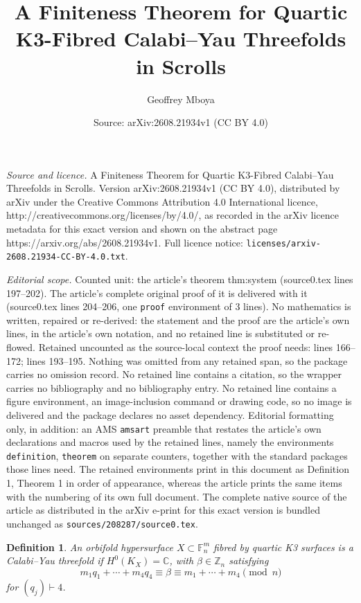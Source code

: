 \documentclass[10pt,a4paper]{amsart}
\title{A Finiteness Theorem for Quartic K3-Fibred Calabi--Yau Threefolds in Scrolls}
\author{Geoffrey Mboya}
\date{Source: arXiv:2608.21934v1 (CC BY 4.0)}
\newtheorem{definition}{Definition}
\newcommand{\CC}{\mathbb{C}}
\newcommand{\F}{\mathbb{F}}
\newcommand{\ZZ}{\mathbb{Z}}
\begin{document}
\maketitle

\noindent\emph{Source and licence.} A Finiteness Theorem for Quartic K3-Fibred Calabi--Yau Threefolds in Scrolls. Version arXiv:2608.21934v1 (CC BY 4.0), distributed by arXiv under the Creative Commons Attribution 4.0 International licence, http://creativecommons.org/licenses/by/4.0/, as recorded in the arXiv licence metadata for this exact version and shown on the abstract page https://arxiv.org/abs/2608.21934v1. Full licence notice: \texttt{licenses/arxiv-2608.21934-CC-BY-4.0.txt}.\par\smallskip

\noindent\textit{Editorial scope.} Counted unit: the article's theorem thm:system (source0.tex lines 197--202). The article's complete original proof of it is delivered with it (source0.tex lines 204--206, one \texttt{proof} environment of 3 lines). No mathematics is written, repaired or re-derived: the statement and the proof are the article's own lines, in the article's own notation, and no retained line is substituted or re-flowed.  Retained uncounted as the source-local context the proof needs: lines 166--172; lines 193--195.  Nothing was omitted from any retained span, so the package carries no omission record.  No retained line contains a citation, so the wrapper carries no bibliography and no bibliography entry.  No retained line contains a figure environment, an image-inclusion command or drawing code, so no image is delivered and the package declares no asset dependency.  Editorial formatting only, in addition: an AMS \texttt{amsart} preamble that restates the article's own declarations and macros used by the retained lines, namely the environments \texttt{definition}, \texttt{theorem} on separate counters, together with the standard packages those lines need.  The retained environments print in this document as Definition 1, Theorem 1 in order of appearance, whereas the article prints the same items with the numbering of its own full document.  The complete native source of the article as distributed in the arXiv e-print for this exact version is bundled unchanged as \texttt{sources/208287/source0.tex}.
	\begin{definition}\label{def:CY}
		An orbifold hypersurface $X\subset\F^m_n$ fibred by quartic K3 surfaces is a \emph{Calabi--Yau threefold} if $H^0(K_X)=\CC$, with $\beta\in\ZZ_n$ satisfying
		\[
		m_1q_1+\cdots+m_4q_4\equiv\beta\equiv m_1+\cdots+m_4\pmod n
		\]
		for $(q_j)\vdash4$.
	\end{definition}
\end{document}
